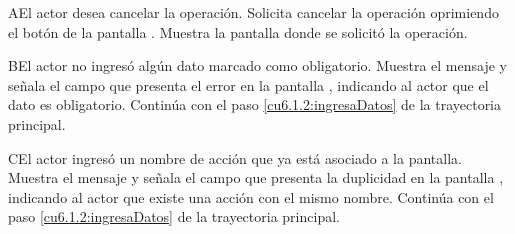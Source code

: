  \begin{UCtrayectoriaA}{A}{El actor desea cancelar la operación.}
    \UCpaso[\UCactor] Solicita cancelar la operación oprimiendo el botón  de la pantalla .
    \UCpaso[\UCsist] Muestra la pantalla donde se solicitó la operación.
 \end{UCtrayectoriaA}
 \begin{UCtrayectoriaA}{B}{El actor no ingresó algún dato marcado como obligatorio.}
    \UCpaso[\UCsist] Muestra el mensaje  y señala el campo que presenta el error en la pantalla 
	    , indicando al actor que el dato es obligatorio.
    \UCpaso[] Continúa con el paso \ref{cu6.1.2:ingresaDatos} de la trayectoria principal.
 \end{UCtrayectoriaA}
 \begin{UCtrayectoriaA}{C}{El actor ingresó un nombre de acción que ya está asociado a la pantalla.}
    \UCpaso[\UCsist] Muestra el mensaje  y señala el campo que presenta la duplicidad en la pantalla 
	    , indicando al actor que existe una acción con el mismo nombre.
    \UCpaso[] Continúa con el paso \ref{cu6.1.2:ingresaDatos} de la trayectoria principal.
 \end{UCtrayectoriaA}
 
